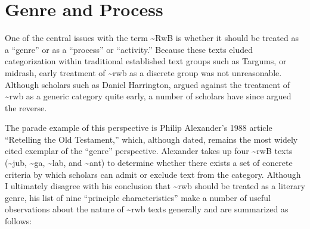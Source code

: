 \section{Genre and Process}\label{genre-and-process}

One of the central issues with the term \textasciitilde{}RwB is whether
it should be treated as a ``genre'' or as a ``process'' or ``activity.''
Because these texts eluded categorization within traditional established
text groups such as Targums, or midrash, early treatment of
\textasciitilde{}rwb as a discrete group was not unreasonable. Although
scholars such as Daniel Harrington, argued against the treatment of
\textasciitilde{}rwb as a generic category quite
early,\autocite{harrington_kraft-nickelsburg1986} a number of scholars
have since argued the reverse.

The parade example of this perspective is Philip Alexander's 1988
article ``Retelling the Old Testament,'' which, although dated, remains
the most widely cited exemplar of the ``genre''
perspective.\autocite{alexander_carson-williamson1988} Alexander takes
up four \textasciitilde{}rwB texts (\textasciitilde{}jub,
\textasciitilde{}ga, \textasciitilde{}lab, and \textasciitilde{}ant) to
determine whether there exists a set of concrete criteria by which
scholars can admit or exclude text from the category. Although I
ultimately disagree with his conclusion that \textasciitilde{}rwb should
be treated as a literary genre, his list of nine ``principle
characteristics'' make a number of useful observations about the nature
of \textasciitilde{}rwb texts generally and are summarized as follows:


